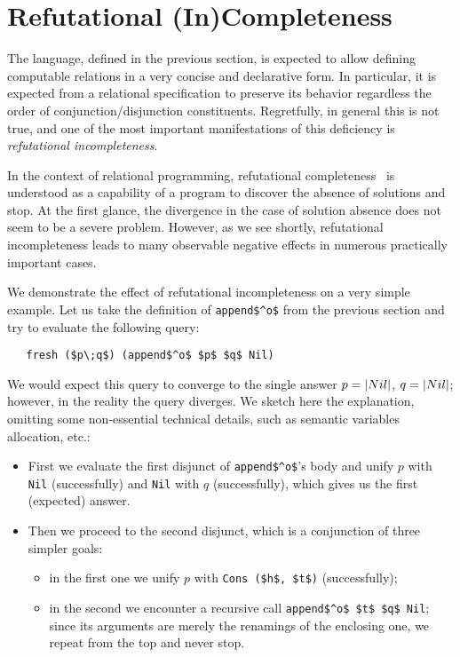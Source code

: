 \section{Refutational (In)Completeness}
\label{incompleteness}

The language, defined in the previous section, is expected to allow defining computable relations in a 
very concise and declarative form. In particular, it is expected from a relational 
specification to preserve its behavior regardless the order of conjunction/disjunction 
constituents. Regretfully, in general this is not true, and one of the most important
manifestations of this deficiency is \emph{refutational incompleteness}.  

In the context of relational programming, refutational completeness~\cite{WillThesis} is understood as 
a capability of a program to discover the absence of solutions and stop. At the first glance,
the divergence in the case of solution absence does not seem to be a severe problem. However, as
we see shortly, refutational incompleteness leads to many observable negative effects in numerous
practically important cases. 

We demonstrate the effect of refutational incompleteness on a very simple example. Let us take the
definition of \lstinline{append$^o$} from the previous section and try to evaluate the following query:

\begin{lstlisting}
   fresh ($p\;q$) (append$^o$ $p$ $q$ Nil)
\end{lstlisting}

We would expect this query to converge to the single answer \mbox{$p=\lstinline|Nil|$}, \mbox{$q=\lstinline|Nil|$};
however, in the reality the query diverges. We sketch here the explanation, omitting some non-essential technical
details, such as semantic variables allocation, etc.:

\begin{itemize}
\item First we evaluate the first disjunct of \lstinline|append$^o$|'s body and unify $p$ with \lstinline|Nil| (successfully)
and \lstinline|Nil| with $q$ (successfully), which gives us the first (expected) answer.

\item Then we proceed to the second disjunct, which is a conjunction of three simpler goals:

  \begin{itemize} 
     \item in the first one we unify $p$ with \lstinline|Cons ($h$, $t$)| (successfully);
     \item in the second we encounter a recursive call \lstinline|append$^o$ $t$ $q$ Nil|; since its arguments are merely the renamings of the enclosing one, we repeat from the top and never stop.
  \end{itemize} 
\end{itemize}

